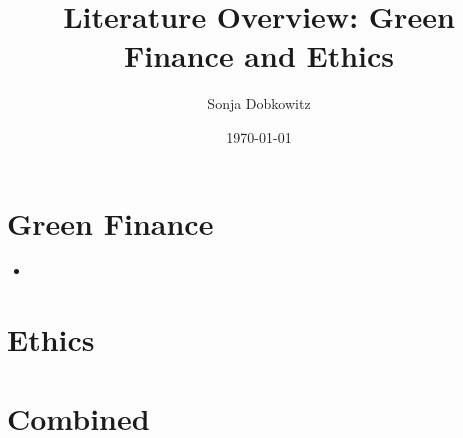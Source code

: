 \documentclass{article}
\title{Literature Overview: Green Finance and Ethics}
\author{Sonja Dobkowitz}
\date{\today}
\begin{document}
\maketitle

\section{Green Finance}
\begin{itemize}
	\item 
\end{itemize}
\section{Ethics}
\section{Combined}
	
	\newpage
	
	
	
\end{document}
